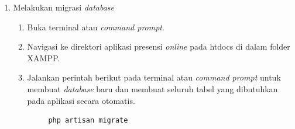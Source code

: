 \begin{enumerate}
    \item Melakukan migrasi \textit{database}
    \begin{enumerate}
        \item Buka terminal atau \textit{command prompt}.
        \item Navigasi ke direktori aplikasi presensi \textit{online} pada htdocs di dalam folder XAMPP.
        \item Jalankan perintah berikut pada terminal atau \textit{command prompt} untuk membuat \textit{database} baru dan membuat seluruh tabel yang dibutuhkan pada aplikasi secara otomatis.
         {\small\begin{verbatim}     php artisan migrate
\end{verbatim}}
    \end{enumerate}
      
\end{enumerate}
